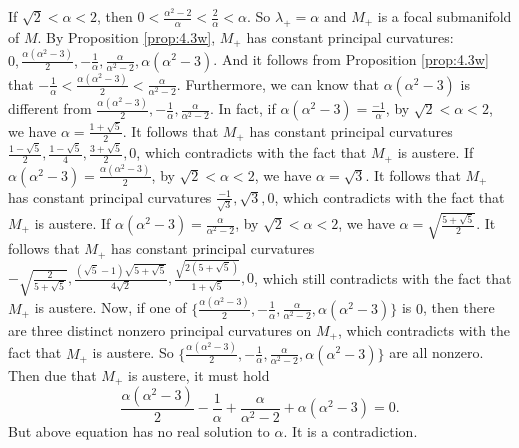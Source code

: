 \documentclass[reqno]{amsart}%
\theoremstyle{definition}
\numberwithin{equation}{section}
\begin{document}
If $\sqrt{2}<\alpha<2$, then $0<\frac{\alpha^2-2}{\alpha}<\frac{2}{\alpha}<\alpha$. So $\lambda_+=\alpha$
and $M_+$ is a focal submanifold of $M$. By Proposition \ref{prop:4.3w}, $M_+$ has
constant principal curvatures:
$0,\frac{\alpha(\alpha^2-3)}{2},-\frac{1}{\alpha},\frac{\alpha}{\alpha^2-2},\alpha(\alpha^2-3)$.
And it follows from
Proposition \ref{prop:4.3w} that $-\frac{1}{\alpha}<\frac{\alpha(\alpha^2-3)}{2}<\frac{\alpha}{\alpha^2-2}$.
Furthermore, we can know that $\alpha(\alpha^2-3)$ is different from $\frac{\alpha(\alpha^2-3)}{2},-\frac{1}{\alpha},\frac{\alpha}{\alpha^2-2}$. In
fact, if $\alpha(\alpha^2-3)=\frac{-1}{\alpha}$, by $\sqrt{2}<\alpha<2$, we have $\alpha=\frac{1+\sqrt{5}}{2}$. It follows that $M_+$
has constant principal curvatures $\frac{1-\sqrt{5}}{2},\frac{1-\sqrt{5}}{4},\frac{3+\sqrt{5}}{2},0$, which contradicts with the fact that $M_+$ is austere.
If $\alpha(\alpha^2-3)=\frac{\alpha(\alpha^2-3)}{2}$, by $\sqrt{2}<\alpha<2$, we have $\alpha=\sqrt{3}$. It follows that $M_+$
has constant principal curvatures $\frac{-1}{\sqrt{3}},\sqrt{3},0$, which contradicts with the fact that $M_+$ is austere. If $\alpha(\alpha^2-3)=\frac{\alpha}{\alpha^2-2}$, by $\sqrt{2}<\alpha<2$, we have $\alpha=\sqrt{\frac{5+\sqrt{5}}{2}}$. It follows that $M_+$
has constant principal curvatures $-\sqrt{\frac{2}{5+\sqrt{5}}},\frac{(\sqrt{5}-1)\sqrt{5+\sqrt{5}}}{4\sqrt{2}},
\frac{\sqrt{2(5+\sqrt{5})}}{1+\sqrt{5}},0$, which still contradicts with the fact that $M_+$ is austere.
Now, if one of $\{\frac{\alpha(\alpha^2-3)}{2},-\frac{1}{\alpha},\frac{\alpha}{\alpha^2-2},\alpha(\alpha^2-3)\}$ is $0$, then there are three distinct nonzero principal curvatures on $M_+$, which
contradicts with the fact that $M_+$ is austere. So $\{\frac{\alpha(\alpha^2-3)}{2},-\frac{1}{\alpha},\frac{\alpha}{\alpha^2-2},\alpha(\alpha^2-3)\}$ are all nonzero. Then due that $M_+$ is austere, it must hold
$$
\frac{\alpha(\alpha^2-3)}{2}-\frac{1}{\alpha}+\frac{\alpha}{\alpha^2-2}+\alpha(\alpha^2-3)=0.
$$
But above equation has no real solution to $\alpha$. It is a contradiction.
\end{document}
